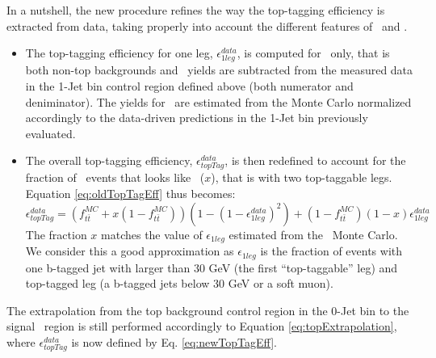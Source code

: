 In a nutshell, the new procedure refines the way the top-tagging
efficiency is extracted from data, taking properly into account the
different features of \ttbar\ and \tw{}.
\begin{itemize}

\item 
The top-tagging efficiency for one leg, $\epsilon_{1leg}^{data}$, is
computed for \ttbar\ only, that is both non-top backgrounds and \tw\
yields are subtracted from the measured data in the 1-Jet bin control
region defined above (both numerator and deniminator).  The yields
for \tw\ are estimated from the Monte Carlo normalized accordingly to
the data-driven predictions in the 1-Jet bin previously evaluated.

\item 
The overall top-tagging efficiency, $\epsilon_{topTag}^{data}$, is
then redefined to account for the fraction of \tw\ events that looks
like \ttbar\ ($x$), that is with two top-taggable legs.
Equation \ref{eq:oldTopTagEff} thus becomes:
\begin{equation} \label{eq:newTopTagEff}
\epsilon_{topTag}^{data} = (f_{t\bar{t}}^{MC} + x(1-f_{t\bar{t}}^{MC}) )(1-(1-\epsilon_{1leg}^{data})^2) + (1-f_{t\bar{t}}^{MC})(1-x)\epsilon_{1leg}^{data}
\end{equation} 
The fraction $x$ matches the value of $\epsilon_{1leg}$ estimated from
the \tw\ Monte Carlo.  We consider this a good approximation as
$\epsilon_{1leg}$ is the fraction of events with one b-tagged jet
with \pt larger than 30 GeV (the first ``top-taggable'' leg) and
top-tagged leg (a b-tagged jets below 30 GeV or a soft muon).

\end{itemize}

The extrapolation from the top background control region in the 0-Jet
bin to the signal \WW\ region is still performed accordingly to
Equation \ref{eq:topExtrapolation}, where $\epsilon_{topTag}^{data}$
is now defined by Eq. \ref{eq:newTopTagEff}.



